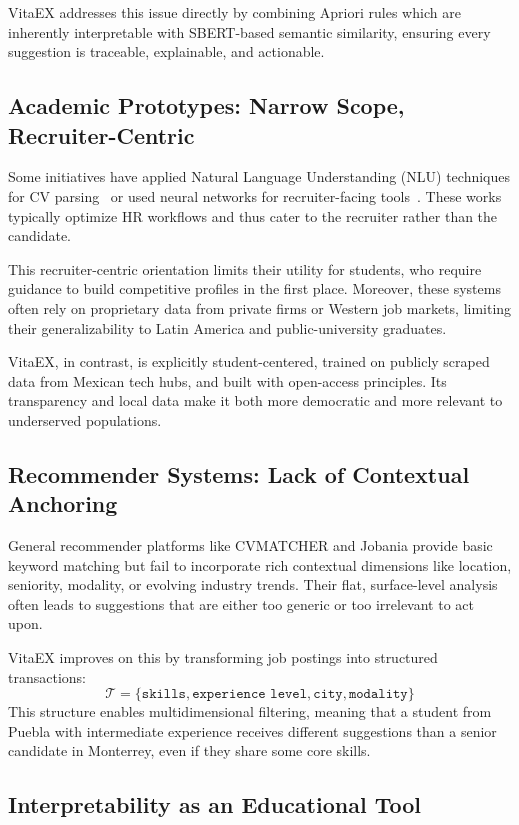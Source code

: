 \documentclass{svproc} %
\begin{document}
	VitaEX addresses this issue directly by combining Apriori rules which are inherently interpretable with SBERT-based semantic similarity, ensuring every suggestion is traceable, explainable, and actionable.
	
	\subsection{Academic Prototypes: Narrow Scope, Recruiter-Centric}
	
	Some initiatives have applied Natural Language Understanding (NLU) techniques for CV parsing~\cite{estadoarte1} or used neural networks for recruiter-facing tools~\cite{estadoarte4}. These works typically optimize HR workflows and thus cater to the recruiter rather than the candidate.
	
	This recruiter-centric orientation limits their utility for students, who require guidance to build competitive profiles in the first place. Moreover, these systems often rely on proprietary data from private firms or Western job markets, limiting their generalizability to Latin America and public-university graduates.
	
	VitaEX, in contrast, is explicitly student-centered, trained on publicly scraped data from Mexican tech hubs, and built with open-access principles. Its transparency and local data make it both more democratic and more relevant to underserved populations.
	
	\subsection{Recommender Systems: Lack of Contextual Anchoring}
	
	General recommender platforms like CVMATCHER and Jobania provide basic keyword matching but fail to incorporate rich contextual dimensions like location, seniority, modality, or evolving industry trends. Their flat, surface-level analysis often leads to suggestions that are either too generic or too irrelevant to act upon.
	
	VitaEX improves on this by transforming job postings into structured transactions:
	\[
	\mathcal{T} = \{\texttt{skills}, \texttt{experience level}, \texttt{city}, \texttt{modality}\}
	\]
	This structure enables multidimensional filtering, meaning that a student from Puebla with intermediate experience receives different suggestions than a senior candidate in Monterrey, even if they share some core skills.
	
	\subsection{Interpretability as an Educational Tool}
	
\end{document}
